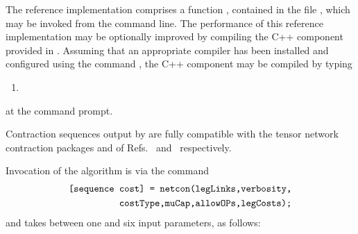
The reference implementation %
comprises a \MATLAB{} function , contained in the file , which may be invoked from the \MATLAB{} command line. The performance of this reference implementation may be optionally improved by compiling the C++ component provided in . Assuming that an appropriate compiler has been installed and configured using the \MATLAB{} command , the C++ component may be compiled by typing
\begin{enumerate}
\item[] 
\end{enumerate}
at the \MATLAB{} command prompt.

Contraction sequences output by  are fully compatible with the tensor network contraction packages  and  of Refs.~ and~ respectively.



Invocation of the algorithm is via the \MATLAB{} command
\begin{align*}
\texttt{[sequence cost] = netcon(legLinks,verbosity,}\\\texttt{costType,muCap,allowOPs,legCosts);}
\end{align*}
and takes between one and six input parameters, as follows:

